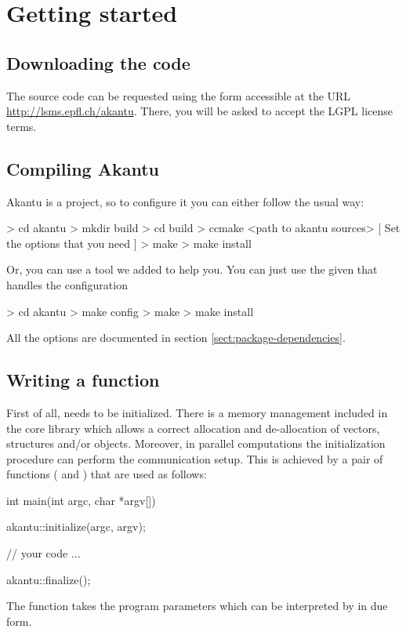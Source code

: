 \chapter{Getting started}
\section{Downloading the code}

The \akantu source code can be requested using the form accessible at the URL
\url{http://lsms.epfl.ch/akantu}.  There, you will be asked to accept the LGPL
license terms.

\section{Compiling Akantu}

Akantu is a  project, so to configure it you can either follow the usual way:
\begin{command}
  > cd akantu
  > mkdir build
  > cd build
  > ccmake <path to akantu sources>
  [ Set the options that you need ]
  > make
  > make install
\end{command}

\noindent Or, you can use a tool  we added to help you. You can just use the
given  that handles the  configuration

\begin{command}
  > cd akantu
  > make config
  > make
  > make install
\end{command}

\noindent All the \akantu options are documented in section
\vref{sect:package-dependencies}.


\section{Writing a  function\label{sect:common:main}}

First of all, \akantu needs to be initialized.  There is a memory
management included in the core library which allows a correct
allocation and de-allocation of vectors, structures and/or
objects. Moreover, in parallel computations the initialization
procedure can perform the communication setup. This is achieved by
 a pair of functions ( and )
that are used as follows:
\begin{cpp}
int main(int argc, char *argv[])
{
  akantu::initialize(argc, argv);

  // your code
  ...

  akantu::finalize();
}
\end{cpp}
The  function takes the program parameters which
can be interpreted by \akantu in due form.

